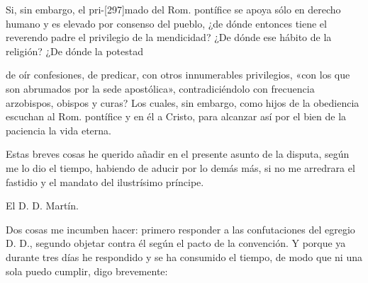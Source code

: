 Si, sin embargo, el pri-[297]mado del Rom. pontífice se apoya sólo en derecho humano y es elevado por consenso del pueblo, ¿de dónde entonces tiene el reverendo padre el privilegio de la mendicidad? ¿De dónde ese hábito de la religión? ¿De dónde la potestad

de oír confesiones, de predicar, con otros innumerables privilegios, «con los que son abrumados por la sede apostólica», contradiciéndolo con frecuencia arzobispos, obispos y curas? Los cuales, sin embargo, como hijos de la obediencia escuchan al Rom. pontífice y en él a Cristo, para alcanzar así por el bien de la paciencia la vida eterna.

Estas breves cosas he querido añadir en el presente asunto de la disputa, según me lo dio el tiempo, habiendo de aducir por lo demás más, si no me arredrara el fastidio y el mandato del ilustrísimo príncipe.

El D. D. Martín.

Dos cosas me incumben hacer: primero responder a las confutaciones del egregio D. D., segundo objetar contra él según el pacto de la convención. Y porque ya durante tres días he respondido y se ha consumido el tiempo, de modo que ni una sola puedo cumplir, digo brevemente:

